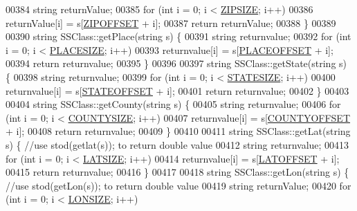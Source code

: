 \begin{DoxyCode}
00384     \textcolor{keywordtype}{string} returnValue;
00385     \textcolor{keywordflow}{for} (\textcolor{keywordtype}{int} i = 0; i < \hyperlink{SSClass_8h_afed733ffdf6aafbaf75b52ea1999b6b4}{ZIPSIZE}; i++)
00386         returnValue[i] = s[\hyperlink{SSClass_8h_a23160a846653bd4df3c5b10c77d23073}{ZIPOFFSET} + i];
00387     \textcolor{keywordflow}{return} returnValue;
00388 \}
00389 
00390 \textcolor{keywordtype}{string} SSClass::getPlace(\textcolor{keywordtype}{string} s) \{
00391     \textcolor{keywordtype}{string} returnvalue;
00392     \textcolor{keywordflow}{for} (\textcolor{keywordtype}{int} i = 0; i < \hyperlink{SSClass_8h_a6802669f0c794331636a12aad9da53f5}{PLACESIZE}; i++)
00393         returnvalue[i] = s[\hyperlink{SSClass_8h_af8f8ce23c8243455601f7d14ac1e1f0b}{PLACEOFFSET} + i];
00394     \textcolor{keywordflow}{return} returnvalue;
00395 \}
00396 
00397 \textcolor{keywordtype}{string} SSClass::getState(\textcolor{keywordtype}{string} s) \{
00398     \textcolor{keywordtype}{string} returnvalue;
00399     \textcolor{keywordflow}{for} (\textcolor{keywordtype}{int} i = 0; i < \hyperlink{SSClass_8h_afca7ce02d5a6576fdfbd5e9ec81907d9}{STATESIZE}; i++)
00400         returnvalue[i] = s[\hyperlink{SSClass_8h_a5b27069b5f4f6134864692af92c6a10e}{STATEOFFSET} + i];
00401     \textcolor{keywordflow}{return} returnvalue;
00402 \}
00403 
00404 \textcolor{keywordtype}{string} SSClass::getCounty(\textcolor{keywordtype}{string} s) \{
00405     \textcolor{keywordtype}{string} returnvalue;
00406     \textcolor{keywordflow}{for} (\textcolor{keywordtype}{int} i = 0; i < \hyperlink{SSClass_8h_a5abe6ba10e2e2da36a217ddc89de08ca}{COUNTYSIZE}; i++)
00407         returnvalue[i] = s[\hyperlink{SSClass_8h_a1ef0c56bf76a1106c7a04816609297b6}{COUNTYOFFSET} + i];
00408     \textcolor{keywordflow}{return} returnvalue;
00409 \}
00410 
00411 \textcolor{keywordtype}{string} SSClass::getLat(\textcolor{keywordtype}{string} s) \{ \textcolor{comment}{//use stod(getlat(s)); to return double value}
00412     \textcolor{keywordtype}{string} returnvalue;
00413     \textcolor{keywordflow}{for} (\textcolor{keywordtype}{int} i = 0; i < \hyperlink{SSClass_8h_a68fc5e9dd6f56a07f44be183f6e4838b}{LATSIZE}; i++)
00414         returnvalue[i] = s[\hyperlink{SSClass_8h_a008e15601aa41491b6e9093364fbe38a}{LATOFFSET} + i];
00415     \textcolor{keywordflow}{return} returnvalue;
00416 \}
00417 
00418 \textcolor{keywordtype}{string} SSClass::getLon(\textcolor{keywordtype}{string} s) \{ \textcolor{comment}{//use stod(getLon(s)); to return double value}
00419     \textcolor{keywordtype}{string} returnValue;
00420     \textcolor{keywordflow}{for} (\textcolor{keywordtype}{int} i = 0; i < \hyperlink{SSClass_8h_a6f928b3e03e80473ea43f148bdb39156}{LONSIZE}; i++)

\end{DoxyCode}
